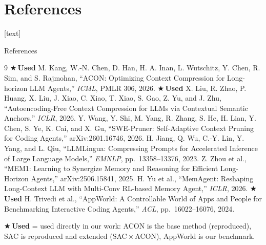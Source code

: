 \documentclass[aspectratio=169,10pt]{beamer}
\begin{document}
\section*{References}
[text]
\begin{frame}{References}
\scriptsize
\begin{thebibliography}{9}
 \textcolor{cmpgreen}{\textbf{$\bigstar$\,Used}} M. Kang, W.-N. Chen, D. Han, H. A. Inan, L. Wutschitz, Y. Chen,
R. Sim, and S. Rajmohan, ``ACON: Optimizing Context Compression for
Long-horizon LLM Agents,'' \emph{ICML}, PMLR 306, 2026.
 \textcolor{cmpgreen}{\textbf{$\bigstar$\,Used}} X. Liu, R. Zhao, P. Huang, X. Liu, J. Xiao, C. Xiao, T. Xiao,
S. Gao, Z. Yu, and J. Zhu, ``Autoencoding-Free Context Compression for LLMs via
Contextual Semantic Anchors,'' \emph{ICLR}, 2026.
 Y. Wang, Y. Shi, M. Yang, R. Zhang, S. He, H. Lian,
Y. Chen, S. Ye, K. Cai, and X. Gu, ``SWE-Pruner: Self-Adaptive Context Pruning
for Coding Agents,'' arXiv:2601.16746, 2026.
 H. Jiang, Q. Wu, C.-Y. Lin, Y. Yang, and L. Qiu,
``LLMLingua: Compressing Prompts for Accelerated Inference of Large Language
Models,'' \emph{EMNLP}, pp.~13358--13376, 2023.
 Z. Zhou et al., ``MEM1: Learning to Synergize Memory and
Reasoning for Efficient Long-Horizon Agents,'' arXiv:2506.15841, 2025.
 H. Yu et al., ``MemAgent: Reshaping Long-Context LLM with
Multi-Conv RL-based Memory Agent,'' \emph{ICLR}, 2026.
 \textcolor{cmpgreen}{\textbf{$\bigstar$\,Used}} H. Trivedi et al., ``AppWorld: A Controllable World of Apps
and People for Benchmarking Interactive Coding Agents,'' \emph{ACL},
pp.~16022--16076, 2024.
\end{thebibliography}
\vspace{0.1cm}
{\scriptsize\textcolor{cmpgreen}{$\bigstar$\,\textbf{Used}} = used directly in our work: ACON is the base method (reproduced), SAC is reproduced and extended (SAC\,$\times$\,ACON), AppWorld is our benchmark.}
\end{frame}
\end{document}
